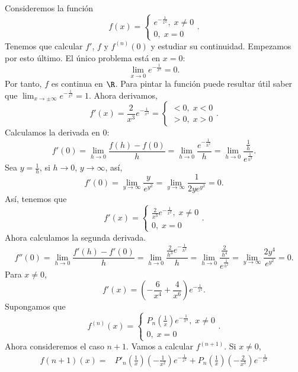 \begin{eg}
\normalfont Consideremos la función 
\[f\left(x\right) = 
\begin{cases}
e^{-\frac{1}{x^{2}}}, \; x \neq 0\\
0, \; x = 0
\end{cases}
.\]
Tenemos que calcular $\displaystyle f' $, $\displaystyle f $ y $\displaystyle f^{\left(n\right)}\left(0\right) $ y estudiar su continuidad. Empezamos por esto último. El único problema está en $\displaystyle x = 0 $:
\[ \lim_{x \to 0}e^{-\frac{1}{x^{2}}} = 0.\]
Por tanto, $\displaystyle f $ es continua en $\displaystyle \R $. Para pintar la función puede resultar útil saber que $\displaystyle \lim_{x \to \pm \infty}e^{-\frac{1}{x^{2}}} = 1 $. Ahora derivamos,
\[ f'\left(x\right) = \frac{2}{x^{3}}e^{-\frac{1}{x^{2}}} = 
\begin{cases}
< 0, \; x < 0 \\
> 0, \; x > 0
\end{cases}
.\]
Calculamos la derivada en 0:
\[f'\left(0\right) = \lim_{h \to 0}\frac{f\left(h\right)-f\left(0\right)}{h} = \lim_{h \to 0}\frac{e^{-\frac{1}{h^{2}}}}{h} = \lim_{h \to 0}\frac{\frac{1}{h}}{e^{\frac{1}{h^{2}}}} .\]
Sea $\displaystyle y = \frac{1}{h} $, si $\displaystyle h \to 0 $, $\displaystyle y \to \infty $, así,
\[f'\left(0\right) = \lim_{y \to \infty}\frac{y}{e^{y^{2}}} = \lim_{y \to \infty}\frac{1}{2ye^{y^{2}}} = 0 .\]
Así, tenemos que 
\[f'\left(x\right) = 
\begin{cases}
\frac{2}{x^{3}}e^{-\frac{1}{x^{2}}}, \; x \neq 0\\
0, \; x = 0
\end{cases}
.\]
Ahora calculamos la segunda derivada.
\[f''\left(0\right) = \lim_{h \to 0}\frac{f'\left(h\right)-f'\left(0\right)}{h} = \lim_{h \to 0} \frac{\frac{2}{h^{3}}e^{-\frac{1}{h^{2}}}}{h} = \lim_{h \to 0}\frac{\frac{2}{h^{4}}}{e^{\frac{1}{h^{2}}}} = \lim_{y \to \infty}\frac{2y^{4}}{e^{y^{2}}}=0 .\]
Para $\displaystyle x \neq 0 $,
\[f'\left(x\right) = \left(-\frac{6}{x^{4}}+\frac{4}{x^{6}}\right)e^{-\frac{1}{x^{2}}} .\]
Supongamos que 
\[ f^{\left(n\right)}\left(x\right) = 
\begin{cases}
P_{n}\left(\frac{1}{x}\right)e^{-\frac{1}{x^{2}}}, \; x \neq 0\\
0, \; x = 0
\end{cases}
.\]
Ahora consideremos el caso $\displaystyle n + 1 $. Vamos a calcular $\displaystyle f^{\left(n+1\right)} $. Si $\displaystyle x \neq 0 $, 
\[
\begin{split}
	f\left(n+1\right)\left(x\right) = & P'_{n}\left(\frac{1}{x}\right)\left(-\frac{1}{x^{2}}\right)e^{-\frac{1}{x^{2}}} + P_{n}\left(\frac{1}{x}\right)\left(-\frac{2}{x^{3}}\right)e^{-\frac{1}{x^{2}}} \\

\end{split}\]
\end{eg}
